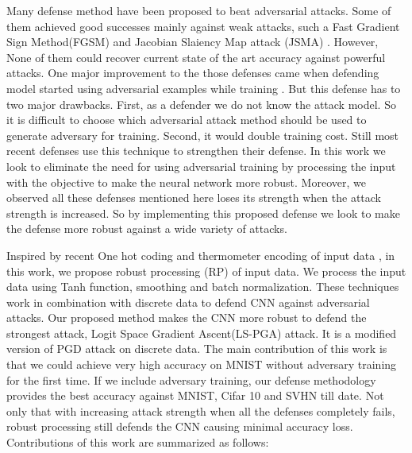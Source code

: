 \documentclass[conference]{IEEEtran}
\begin{document}
Many defense method have been proposed to beat adversarial attacks. Some of them achieved good successes mainly against weak attacks, such a Fast Gradient Sign Method(FGSM) and Jacobian Slaiency Map attack (JSMA) \cite{gu2014towards,papernot2016distillation,papernot2016towards,xu2017feature}. However, None of them could recover current state of the art accuracy against powerful attacks. One major improvement to the those defenses came when defending model started using adversarial examples while training \cite{tramer2017ensemble,mkadry2017towards}. But this defense has to two major drawbacks. First, as a defender we do not know the attack model. So it is difficult to choose which adversarial attack method should be used to generate adversary for training. Second, it would double training cost. Still most recent defenses use this technique to strengthen their defense. In this work we look to eliminate the need for using adversarial training by processing the input with the objective to make the neural network more robust. Moreover, we observed all these defenses mentioned here loses its strength when the attack strength is increased. So by implementing this proposed defense we look to make the defense more robust against a wide variety of attacks.

Inspired by recent One hot coding and thermometer encoding of input data \cite{anonymous2018thermometer}, in this work, we propose robust processing (RP) of input data. We process the input data using Tanh function, smoothing and batch normalization. These techniques work in combination with discrete data to defend CNN against adversarial attacks. Our proposed method makes the CNN more robust to defend the strongest attack, Logit Space Gradient Ascent(LS-PGA) attack. It is a modified version of PGD attack on discrete data. The main contribution of this work is that we could achieve very high accuracy on MNIST without adversary training for the first time. If we include adversary training, our defense methodology provides the best accuracy against MNIST, Cifar 10 and SVHN till date. Not only that with increasing attack strength when all the defenses completely fails, robust processing still defends the CNN causing minimal accuracy loss.  Contributions of this work are summarized as follows:
\end{document}
